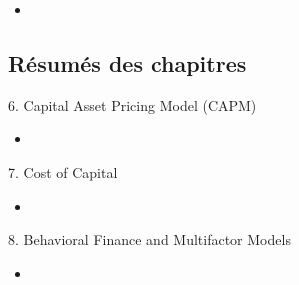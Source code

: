\begin{YTB_vids}
\begin{itemize}
	\item	
\end{itemize}
\end{YTB_vids}

\subsection{Résumés des chapitres}

\begin{CHPT_SUMM_AUTO}[label = {L.-6}]{6. Capital Asset Pricing Model (CAPM)}
	\begin{itemize}
		\item	
	\end{itemize}
\end{CHPT_SUMM_AUTO}

\begin{CHPT_SUMM_AUTO}[label = {L.-7}]{7. Cost of Capital}
	\begin{itemize}
		\item	
	\end{itemize}
\end{CHPT_SUMM_AUTO}

\begin{CHPT_SUMM_AUTO}[label = {L.-8}]{8. Behavioral Finance and Multifactor Models}
	\begin{itemize}
		\item	
	\end{itemize}
\end{CHPT_SUMM_AUTO}

